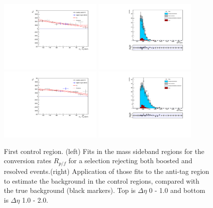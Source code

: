 \begin{figure}[h]
\centering
\includegraphics[width=0.45\textwidth]{F5/HH4b2p1SR_Fit_BG_boostres_dEta0_CR1.pdf}
\includegraphics[width=0.45\textwidth]{F5/HH4b2p1_Plot_BG_boostres_dEta0_CR1.pdf}\\
\includegraphics[width=0.45\textwidth]{F5/HH4b2p1SR_Fit_BG_boostres_dEta1_CR1.pdf}
\includegraphics[width=0.45\textwidth]{F5/HH4b2p1_Plot_BG_boostres_dEta1_CR1.pdf}
\caption{First control region. (left) Fits in the mass sideband regions for the conversion rates $R_{p/f}$ for a selection rejecting both boosted and resolved events.(right) Application of those fits to the anti-tag region to estimate the background in the control regions, compared with the true background (black markers). Top is $\Delta\eta$ 0 - 1.0 and bottom is $\Delta\eta$ 1.0 - 2.0.}
\label{fig:closuredataboostres}
\end{figure}

